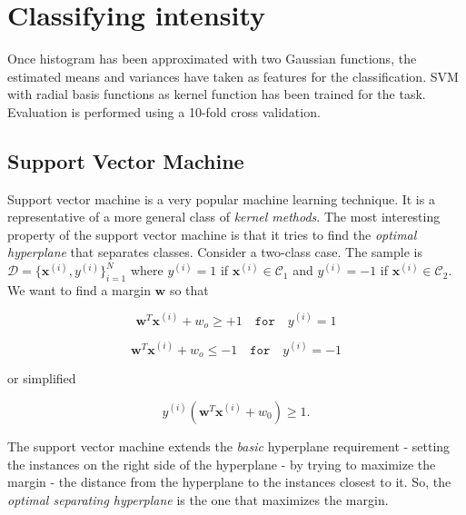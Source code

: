 \section{Classifying intensity}

Once histogram has been approximated with two Gaussian functions, the estimated means and variances have taken as features for the classification. SVM with radial basis functions as kernel function has been trained for the task. Evaluation is performed using a 10-fold cross validation. \\





\subsection{Support Vector Machine}


Support vector machine is a very popular machine learning technique. It is a representative of a more general class of \textit{kernel methods}. The most interesting property of the support vector machine is that it tries to find the \textit{optimal hyperplane} that separates classes. Consider a two-class case. The sample is $\mathcal{D} = \{ \mathbf{x}^{(i)}, y^{(i)} \}_{i=1}^N$ where $y^{(i)} = 1$ if $\mathbf{x}^{(i)} \in \mathcal{C}_1$ and $y^{(i)} = -1$ if $\mathbf{x}^{(i)} \in \mathcal{C}_2$. We want to find a margin $\mathbf{w}$ so that

\begin{equation*}
	\mathbf{w}^T\mathbf{x}^{(i)} + w_o \geq +1 \quad \mathtt{for} \quad y^{(i)} = 1
\end{equation*}

\begin{equation*}
	\mathbf{w}^T\mathbf{x}^{(i)} + w_o \leq -1 \quad \mathtt{for} \quad y^{(i)} = -1
\end{equation*}

or simplified 

\begin{equation*}
	y^{(i)}(\mathbf{w}^T\mathbf{x}^{(i)} + w_0) \geq 1.
\end{equation*}

The support vector machine extends the \textit{basic} hyperplane requirement - setting the instances on the right side of the hyperplane - by trying to maximize the margin - the distance from the hyperplane to the instances closest to it. So, the \textit{optimal separating hyperplane} is the one that maximizes the margin. \\

